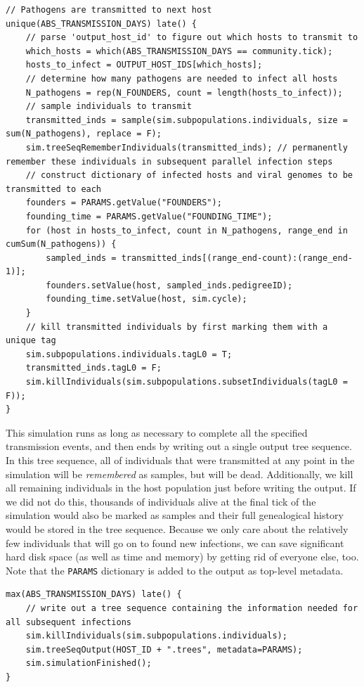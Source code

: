 \documentclass[12pt]{article}
\begin{document}
\begin{verbatim}
// Pathogens are transmitted to next host
unique(ABS_TRANSMISSION_DAYS) late() {
	// parse 'output_host_id' to figure out which hosts to transmit to
	which_hosts = which(ABS_TRANSMISSION_DAYS == community.tick);
	hosts_to_infect = OUTPUT_HOST_IDS[which_hosts];
	// determine how many pathogens are needed to infect all hosts
	N_pathogens = rep(N_FOUNDERS, count = length(hosts_to_infect));
	// sample individuals to transmit
	transmitted_inds = sample(sim.subpopulations.individuals, size = sum(N_pathogens), replace = F);
	sim.treeSeqRememberIndividuals(transmitted_inds); // permanently remember these individuals in subsequent parallel infection steps
	// construct dictionary of infected hosts and viral genomes to be transmitted to each
	founders = PARAMS.getValue("FOUNDERS");
	founding_time = PARAMS.getValue("FOUNDING_TIME");
	for (host in hosts_to_infect, count in N_pathogens, range_end in cumSum(N_pathogens)) {
		sampled_inds = transmitted_inds[(range_end-count):(range_end-1)];
		founders.setValue(host, sampled_inds.pedigreeID);
		founding_time.setValue(host, sim.cycle);
	}
	// kill transmitted individuals by first marking them with a unique tag
	sim.subpopulations.individuals.tagL0 = T;
	transmitted_inds.tagL0 = F;
	sim.killIndividuals(sim.subpopulations.subsetIndividuals(tagL0 = F));
}
\end{verbatim}

This simulation runs as long as necessary to complete all the specified transmission events, and then ends by writing out a single output tree sequence. In this tree sequence, all of
individuals that were transmitted at any point in the simulation will be \textit{remembered} as samples, but will be dead. Additionally, we kill all remaining individuals in the host population
just before writing the output. If we did not do this, thousands of individuals alive at the final tick of the simulation would also be marked as samples and their full genealogical history
would be stored in the tree sequence. Because we only care about the relatively few individuals that will go on to found new infections, we can save significant hard disk space
(as well as time and memory) by getting rid of everyone else, too. Note that the \verb|PARAMS| dictionary is added to the output as top-level metadata.

\begin{verbatim}
max(ABS_TRANSMISSION_DAYS) late() {
	// write out a tree sequence containing the information needed for all subsequent infections
	sim.killIndividuals(sim.subpopulations.individuals);
	sim.treeSeqOutput(HOST_ID + ".trees", metadata=PARAMS);
	sim.simulationFinished();
}
\end{verbatim}
\end{document}
